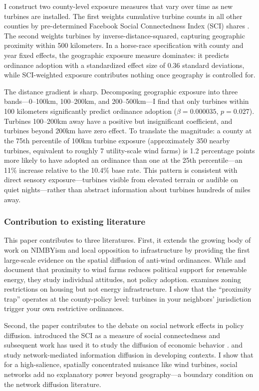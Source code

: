 \documentclass[12pt]{article}
\begin{document}
I construct two county-level exposure measures that vary over time as new turbines are installed. The first weights cumulative turbine counts in all other counties by pre-determined Facebook Social Connectedness Index (SCI) shares \citep{bailey2018}. The second weights turbines by inverse-distance-squared, capturing geographic proximity within 500 kilometers. In a horse-race specification with county and year fixed effects, the geographic exposure measure dominates: it predicts ordinance adoption with a standardized effect size of 0.36 standard deviations, while SCI-weighted exposure contributes nothing once geography is controlled for.

The distance gradient is sharp. Decomposing geographic exposure into three bands---0--100km, 100--200km, and 200--500km---I find that only turbines within 100 kilometers significantly predict ordinance adoption ($\hat{\beta} = 0.000035$, $p = 0.027$). Turbines 100--200km away have a positive but insignificant coefficient, and turbines beyond 200km have zero effect. To translate the magnitude: a county at the 75th percentile of 100km turbine exposure (approximately 350 nearby turbines, equivalent to roughly 7 utility-scale wind farms) is 1.2 percentage points more likely to have adopted an ordinance than one at the 25th percentile---an 11\% increase relative to the 10.4\% base rate. This pattern is consistent with direct sensory exposure---turbines visible from elevated terrain or audible on quiet nights---rather than abstract information about turbines hundreds of miles away.

\subsubsection*{Contribution to existing literature} This paper contributes to three literatures. First, it extends the growing body of work on NIMBYism and local opposition to infrastructure by providing the first large-scale evidence on the spatial diffusion of anti-wind ordinances. While \citet{stokes2016} and \citet{urpelainen2022} document that proximity to wind farms reduces political support for renewable energy, they study individual attitudes, not policy adoption. \citet{brunner2022} examines zoning restrictions on housing but not energy infrastructure. I show that the ``proximity trap'' operates at the county-policy level: turbines in your neighbors' jurisdiction trigger your own restrictive ordinances.

Second, the paper contributes to the debate on social network effects in policy diffusion. \citet{bailey2018} introduced the SCI as a measure of social connectedness and subsequent work has used it to study the diffusion of economic behavior \citep{kuchler2022, bailey2022}. \citet{beaman2012} and \citet{banerjee2013} study network-mediated information diffusion in developing contexts. I show that for a high-salience, spatially concentrated nuisance like wind turbines, social networks add no explanatory power beyond geography---a boundary condition on the network diffusion literature.
\end{document}
